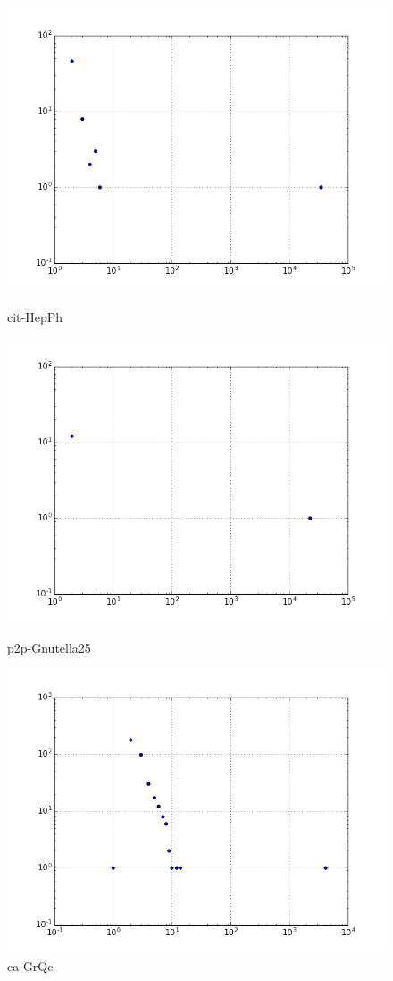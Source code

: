 \begin{figure}[H]
  \includegraphics[width=\linewidth]{img/cit-HepPh/comp_dist.png}
  \caption*{cit-HepPh}
\endminipage\hfill
{}
  \includegraphics[width=\linewidth]{img/p2p-Gnutella25/comp_dist.png}
  \caption*{p2p-Gnutella25}
\endminipage\hfill
{}
  \includegraphics[width=\linewidth]{img/ca-GrQc/comp_dist.png}
  \caption*{ca-GrQc}
\endminipage
\end{figure}
